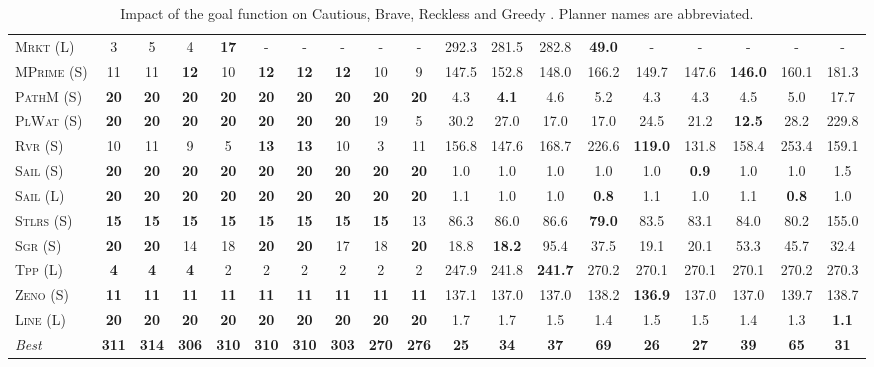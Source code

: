 \begin{table}[tb]
{\begin{tabular}{|l||ccccccccc||ccccccccc||}
\textsc{Mrkt} (L)&3&5&4&\textbf{17}&-&-&-&-&-&292.3&281.5&282.8&\textbf{49.0}&-&-&-&-&-\\
\textsc{MPrime} (S)&11&11&\textbf{12}&10&\textbf{12}&\textbf{12}&\textbf{12}&10&9&147.5&152.8&148.0&166.2&149.7&147.6&\textbf{146.0}&160.1&181.3\\
\textsc{PathM} (S)&\textbf{20}&\textbf{20}&\textbf{20}&\textbf{20}&\textbf{20}&\textbf{20}&\textbf{20}&\textbf{20}&\textbf{20}&4.3&\textbf{4.1}&4.6&5.2&4.3&4.3&4.5&5.0&17.7\\
\textsc{PlWat} (S)&\textbf{20}&\textbf{20}&\textbf{20}&\textbf{20}&\textbf{20}&\textbf{20}&\textbf{20}&19&5&30.2&27.0&17.0&17.0&24.5&21.2&\textbf{12.5}&28.2&229.8\\
\textsc{Rvr} (S)&10&11&9&5&\textbf{13}&\textbf{13}&10&3&11&156.8&147.6&168.7&226.6&\textbf{119.0}&131.8&158.4&253.4&159.1\\
\textsc{Sail} (S)&\textbf{20}&\textbf{20}&\textbf{20}&\textbf{20}&\textbf{20}&\textbf{20}&\textbf{20}&\textbf{20}&\textbf{20}&1.0&1.0&1.0&1.0&1.0&\textbf{0.9}&1.0&1.0&1.5\\
\textsc{Sail} (L)&\textbf{20}&\textbf{20}&\textbf{20}&\textbf{20}&\textbf{20}&\textbf{20}&\textbf{20}&\textbf{20}&\textbf{20}&1.1&1.0&1.0&\textbf{0.8}&1.1&1.0&1.1&\textbf{0.8}&1.0\\
\textsc{Stlrs} (S)&\textbf{15}&\textbf{15}&\textbf{15}&\textbf{15}&\textbf{15}&\textbf{15}&\textbf{15}&\textbf{15}&13&86.3&86.0&86.6&\textbf{79.0}&83.5&83.1&84.0&80.2&155.0\\
\textsc{Sgr} (S)&\textbf{20}&\textbf{20}&14&18&\textbf{20}&\textbf{20}&17&18&\textbf{20}&18.8&\textbf{18.2}&95.4&37.5&19.1&20.1&53.3&45.7&32.4\\
\textsc{Tpp} (L)&\textbf{4}&\textbf{4}&\textbf{4}&2&2&2&2&2&2&247.9&241.8&\textbf{241.7}&270.2&270.1&270.1&270.1&270.2&270.3\\
\textsc{Zeno} (S)&\textbf{11}&\textbf{11}&\textbf{11}&\textbf{11}&\textbf{11}&\textbf{11}&\textbf{11}&\textbf{11}&\textbf{11}&137.1&137.0&137.0&138.2&\textbf{136.9}&137.0&137.0&139.7&138.7\\
\textsc{Line} (L)&\textbf{20}&\textbf{20}&\textbf{20}&\textbf{20}&\textbf{20}&\textbf{20}&\textbf{20}&\textbf{20}&\textbf{20}&1.7&1.7&1.5&1.4&1.5&1.5&1.4&1.3&\textbf{1.1}
\\\hline
\textit{Best}&\textbf{311}&\textbf{314}&\textbf{306}&\textbf{310}&\textbf{310}&\textbf{310}&\textbf{303}&\textbf{270}&\textbf{276}&\textbf{25}&\textbf{34}&\textbf{37}&\textbf{69}&\textbf{26}&\textbf{27}&\textbf{39}&\textbf{65}&\textbf{31}\\\hline

        \end{tabular}}
        \caption{Impact of the goal function on Cautious, Brave, Reckless and Greedy \pattyd. Planner names are abbreviated.}
        \label{tab:abl-gf}
        \end{table}
        